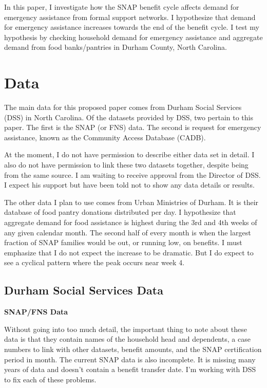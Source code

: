 \documentclass[12pt,letterpaperpaper,]{book}
\begin{document}
In this paper, I investigate how the SNAP benefit cycle affects demand
for emergency assistance from formal support networks. I hypothesize
that demand for emergency assistance increases towards the end of the
benefit cycle. I test my hypothesis by checking household demand for
emergency assistance and aggregate demand from food banks/pantries in
Durham County, North Carolina.

\section*{Data}\label{data-3}

The main data for this proposed paper comes from Durham Social Services
(DSS) in North Carolina. Of the datasets provided by DSS, two pertain to
this paper. The first is the SNAP (or FNS) data. The second is request
for emergency assistance, known as the Community Access Database (CADB).

At the moment, I do not have permission to describe either data set in
detail. I also do not have permission to link these two datasets
together, despite being from the same source. I am waiting to receive
approval from the Director of DSS. I expect his support but have been
told not to show any data details or results.

The other data I plan to use comes from Urban Ministries of Durham. It
is their database of food pantry donations distributed per day. I
hypothesize that aggregate demand for food assistance is highest during
the 3rd and 4th weeks of any given calendar month. The second half of
every month is when the largest fraction of SNAP families would be out,
or running low, on benefits. I must emphasize that I do not expect the
increase to be dramatic. But I do expect to see a cyclical pattern where
the peak occurs near week 4.

\subsection*{Durham Social Services
Data}\label{durham-social-services-data}

\textbf{SNAP/FNS Data}

Without going into too much detail, the important thing to note about
these data is that they contain names of the household head and
dependents, a case numbers to link with other datasets, benefit amounts,
and the SNAP certification period in month. The current SNAP data is
also incomplete. It is missing many years of data and doesn't contain a
benefit transfer date. I'm working with DSS to fix each of these
problems.
\end{document}
